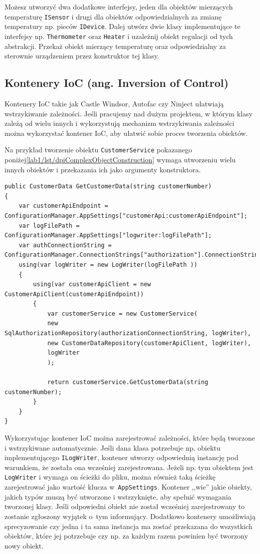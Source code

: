 Możesz utworzyć dwa dodatkowe interfejsy, jeden dla obiektów mierzących temperaturę \texttt{ISensor} i drugi dla obiektów odpowiedzialnych za zmianę temperatury np. pieców \texttt{IDevice}. Dalej utwórz dwie klasy implementujące te interfejsy np. \texttt{Thermometer} oraz \texttt{Heater} i uzależnij obiekt regulacji od tych abstrakcji. Przekaż obiekt mierzący temperaturę oraz odpowiedzialny za sterownie urządzeniem przez konstruktor tej klasy. 

\subsection{Kontenery IoC (ang. Inversion of Control)}
Kontenery IoC takie jak Castle Windsor, Autofac czy Ninject ułatwiają wstrzykiwanie zależności. Jeśli pracujemy nad dużym projektem, w którym klasy zależą od wielu innych i wykorzystują mechanizm wstrzykiwania zależności można wykorzystać kontener IoC, aby ułatwić sobie proces tworzenia obiektów. 

Na przykład tworzenie obiektu \texttt{CustomerService} pokazanego poniżej\ref{lab1/lst/dpiComplexObjectConstruction} wymaga utworzeniu wielu innych obiektów i przekazania ich jako argumenty konstruktora.
\begin{lstlisting}[caption={Tworzenie obiektu posiadającego zależności wstrzykiwane przez konstruktor }, label={lab1/lst/dpiComplexObjectConstruction}]
public CustomerData GetCustomerData(string customerNumber)
{
	var customerApiEndpoint = ConfigurationManager.AppSettings["customerApi:customerApiEndpoint"];
	var logFilePath = ConfigurationManager.AppSettings["logwriter:logFilePath"];
	var authConnectionString = ConfigurationManager.ConnectionStrings["authorization"].ConnectionString;
	using(var logWriter = new LogWriter(logFilePath ))
	{
		using(var customerApiClient = new CustomerApiClient(customerApiEndpoint))
		{
			var customerService = new CustomerService(
			new SqlAuthorizationRepository(authorizationConnectionString, logWriter),
			new CustomerDataRepository(customerApiClient, logWriter),
			logWriter
			);   
			
			return customerService.GetCustomerData(string customerNumber);
		}
	}
}
\end{lstlisting}
Wykorzystując kontener IoC można zarejestrować zależności, które będą tworzone i wstrzykiwane automatycznie. Jeśli dana klasa potrzebuje np. obiektu implementującego \texttt{ILogWriter}, kontener utworzy odpowiednią instancję pod warunkiem, że została ona wcześniej zarejestrowana. Jeżeli np. tym obiektem jest \texttt{LogWriter} i wymaga on ścieżki do pliku, można również taką ścieżkę zarejestrować jako wartość klucza w~\texttt{AppSettings}. Kontener ,,wie'' jakie obiekty, jakich typów muszą być utworzone i wstrzyknięte, aby spełnić wymagania tworzonej klasy. Jeśli odpowiedni obiekt nie został wcześniej zarejestrowany to zostanie zgłoszony wyjątek o~tym informujący. Dodatkowo kontenery umożliwiają sprecyzowanie czy jedna i ta sama instancja ma zostać przekazana do wszystkich obiektów, które jej potrzebuje czy np. za każdym razem powinien być tworzony nowy obiekt.

